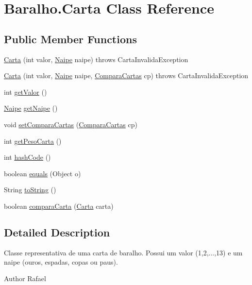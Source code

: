 \hypertarget{class_baralho_1_1_carta}{
\section{Baralho.Carta Class Reference}
\label{class_baralho_1_1_carta}
}
\subsection*{Public Member Functions}
\begin{DoxyCompactItemize}
\item 
\hyperlink{class_baralho_1_1_carta_a0112885d7f19cccbe902005855eaf417}{Carta} (int valor, \hyperlink{namespace_baralho_ab887857dcb81ef6672322ce80039b905}{Naipe} naipe)  throws CartaInvalidaException
\item 
\hyperlink{class_baralho_1_1_carta_ab6f4c7de7f418095d9bad9587c457bea}{Carta} (int valor, \hyperlink{namespace_baralho_ab887857dcb81ef6672322ce80039b905}{Naipe} naipe, \hyperlink{interface_baralho_1_1_compara_cartas}{ComparaCartas} cp)  throws CartaInvalidaException
\item 
int \hyperlink{class_baralho_1_1_carta_a8cd63f6e252c1193bf10ec877f6982f8}{getValor} ()
\item 
\hyperlink{namespace_baralho_ab887857dcb81ef6672322ce80039b905}{Naipe} \hyperlink{class_baralho_1_1_carta_a327a805c7a73b5dce6538fd3f4c7f4ae}{getNaipe} ()
\item 
void \hyperlink{class_baralho_1_1_carta_a05361c159805fb0ad54f7b6a3d358019}{setComparaCartas} (\hyperlink{interface_baralho_1_1_compara_cartas}{ComparaCartas} cp)
\item 
int \hyperlink{class_baralho_1_1_carta_a7bc607ded2e593d2230c4cb0fb35b9d3}{getPesoCarta} ()
\item 
int \hyperlink{class_baralho_1_1_carta_a922703c5ca6a4c0aa2e7b50e5e0522b4}{hashCode} ()
\item 
boolean \hyperlink{class_baralho_1_1_carta_a834eb141943c980aa1c2d78c3c3a8541}{equals} (Object o)
\item 
String \hyperlink{class_baralho_1_1_carta_afd20dd3fad21790f281563e600ba7fe0}{toString} ()
\item 
boolean \hyperlink{class_baralho_1_1_carta_ab96ae30df37af13cb0ab42dcebd02f3e}{comparaCarta} (\hyperlink{class_baralho_1_1_carta}{Carta} carta)
\end{DoxyCompactItemize}


\subsection{Detailed Description}
Classe representativa de uma carta de baralho. Possui um valor (1,2,...,13) e um naipe (ouros, espadas, copas ou paus). \begin{DoxyAuthor}{Author}
Rafael 
\end{DoxyAuthor}


